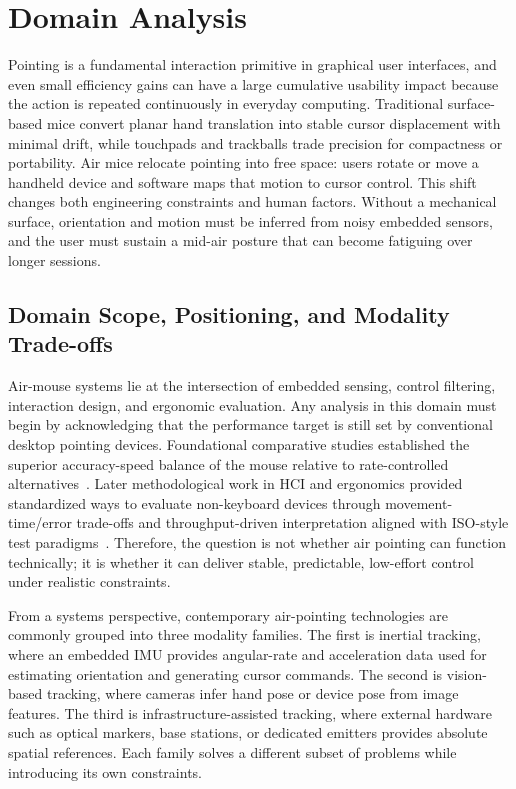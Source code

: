 \section{Domain Analysis}

Pointing is a fundamental interaction primitive in graphical user interfaces, and even small efficiency gains can have a large cumulative usability impact because the action is repeated continuously in everyday computing. Traditional surface-based mice convert planar hand translation into stable cursor displacement with minimal drift, while touchpads and trackballs trade precision for compactness or portability. Air mice relocate pointing into free space: users rotate or move a handheld device and software maps that motion to cursor control. This shift changes both engineering constraints and human factors. Without a mechanical surface, orientation and motion must be inferred from noisy embedded sensors, and the user must sustain a mid-air posture that can become fatiguing over longer sessions.

 

\subsection{Domain Scope, Positioning, and Modality Trade-offs}

Air-mouse systems lie at the intersection of embedded sensing, control filtering, interaction design, and ergonomic evaluation. Any analysis in this domain must begin by acknowledging that the performance target is still set by conventional desktop pointing devices. Foundational comparative studies established the superior accuracy-speed balance of the mouse relative to rate-controlled alternatives~\cite{card1978evaluation}. Later methodological work in HCI and ergonomics provided standardized ways to evaluate non-keyboard devices through movement-time/error trade-offs and throughput-driven interpretation aligned with ISO-style test paradigms~\cite{iso9241_9_2000}. Therefore, the question is not whether air pointing can function technically; it is whether it can deliver stable, predictable, low-effort control under realistic constraints.

From a systems perspective, contemporary air-pointing technologies are commonly grouped into three modality families. The first is inertial tracking, where an embedded IMU provides angular-rate and acceleration data used for estimating orientation and generating cursor commands. The second is vision-based tracking, where cameras infer hand pose or device pose from image features. The third is infrastructure-assisted tracking, where external hardware such as optical markers, base stations, or dedicated emitters provides absolute spatial references. Each family solves a different subset of problems while introducing its own constraints.

